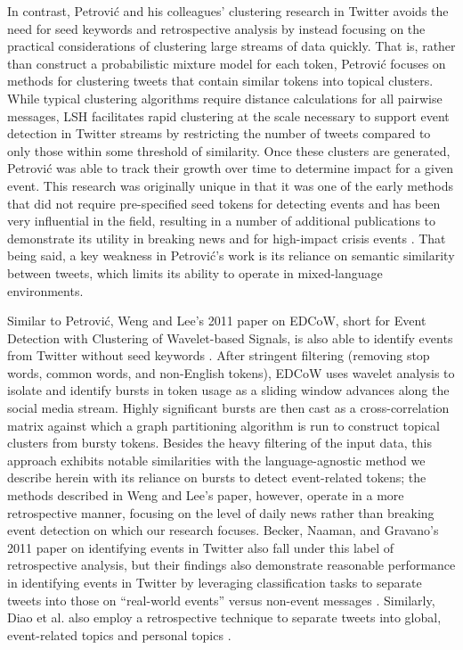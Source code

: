 \documentclass{sig-alternate}
\begin{document}
In contrast, Petrovi\'{c} and his colleagues' clustering research in Twitter avoids the need for seed keywords and retrospective analysis by instead focusing on the practical considerations of clustering large streams of data quickly.
That is, rather than construct a probabilistic mixture model for each token, Petrovi\'{c} focuses on methods for clustering tweets that contain similar tokens into topical clusters.
While typical clustering algorithms require distance calculations for all pairwise messages, LSH facilitates rapid clustering at the scale necessary to support event detection in Twitter streams by restricting the number of tweets compared to only those within some threshold of similarity.
Once these clusters are generated, Petrovi\'{c} was able to track their growth over time to determine impact for a given event.
This research was originally unique in that it was one of the early methods that did not require pre-specified seed tokens for detecting events and has been very influential in the field, resulting in a number of additional publications to demonstrate its utility in breaking news and for high-impact crisis events \cite{osborne2014real,petrovic2013can,6601695}.
That being said, a key weakness in Petrovi\'{c}'s work is its reliance on semantic similarity between tweets, which limits its ability to operate in mixed-language environments.

Similar to Petrovi\'{c}, Weng and Lee's 2011 paper on EDCoW, short for Event Detection with Clustering of Wavelet-based Signals, is also able to identify events from Twitter without seed keywords \cite{weng2011event}.
After stringent filtering (removing stop words, common words, and non-English tokens), EDCoW uses wavelet analysis to isolate and identify bursts in token usage as a sliding window advances along the social media stream.
Highly significant bursts are then cast as a cross-correlation matrix against which a graph partitioning algorithm is run to construct topical clusters from bursty tokens.
Besides the heavy filtering of the input data, this approach exhibits notable similarities with the language-agnostic method we describe herein with its reliance on bursts to detect event-related tokens; the methods described in Weng and Lee's paper, however, operate in a more retrospective manner, focusing on the level of daily news rather than breaking event detection on which our research focuses.
Becker, Naaman, and Gravano's 2011 paper on identifying events in Twitter also fall under this label of retrospective analysis, but their findings also demonstrate reasonable performance in identifying events in Twitter by leveraging classification tasks to separate tweets into those on ``real-world events'' versus non-event messages \cite{becker2011beyond-tr,becker2011beyond}.
Similarly, Diao et al. also employ a retrospective technique to separate tweets into global, event-related topics and personal topics \cite{diao2012finding}.
\end{document}
